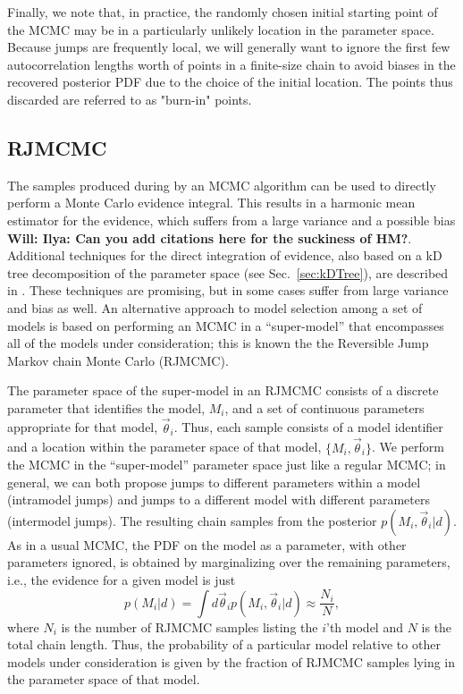 \documentclass[prd,preprint]{revtex4}
\newcommand{\vtheta}{\vec{\theta}}
\newcommand{\be}{\begin{equation}}
\newcommand{\ee}{\end{equation}}
\newcommand{\will}[1]{{\color{blue} \bf Will: #1}}
\begin{document}
Finally, we note that, in practice, the randomly chosen initial starting point of the MCMC may be in a particularly unlikely location in the parameter space.  Because jumps are frequently local, we will generally want to ignore the first few autocorrelation lengths worth of points in a finite-size chain to avoid biases in the recovered posterior PDF due to the choice of the initial location.  The points thus discarded are referred to as "burn-in" points.

\subsection{RJMCMC}

The samples produced during by an MCMC algorithm can be used to
directly perform a Monte Carlo evidence integral.  This results in a
harmonic mean estimator for the evidence, which suffers from a large
variance and a possible bias\will{Ilya: Can you add citations here for
  the suckiness of HM?}.  Additional techniques for the direct
integration of evidence, also based on a kD tree decomposition of the
parameter space (see Sec.~\ref{sec:kDTree}), are described in
\cite{Weinberg2009}.  These techniques are promising, but in some
cases suffer \cite{Farr2010} from large variance and bias as well.  An
alternative approach to model selection among a set of models is based
on performing an MCMC in a ``super-model'' that encompasses all of the
models under consideration; this is known the the Reversible Jump
Markov chain Monte Carlo (RJMCMC).

The parameter space of the super-model in an RJMCMC consists of a
discrete parameter that identifies the model, $M_i$, and a set of
continuous parameters appropriate for that model, $\vtheta_i$.  Thus,
each sample consists of a model identifier and a location within the
parameter space of that model, $\{M_i, \vtheta_i\}$.  We perform the
MCMC in the ``super-model'' parameter space just like a regular MCMC;
in general, we can both propose jumps to different parameters within a
model (intramodel jumps) and jumps to a different model with different
parameters (intermodel jumps).  The resulting chain samples from the
posterior $p(M_i,\vtheta_i|d)$.  As in a usual MCMC, the PDF on the
model as a parameter, with other parameters ignored, is obtained by
marginalizing over the remaining parameters, i.e., the evidence for a
given model is just
%
\be
p(M_i|d) = \int d\vtheta_i p(M_i, \vtheta_i|d) \approx \frac{N_i}{N},
\ee
%
where $N_i$ is the number of RJMCMC samples listing the $i$'th model
and $N$ is the total chain length.  Thus, the probability of a
particular model relative to other models under consideration is given
by the fraction of RJMCMC samples lying in the parameter space of that
model.
 
\end{document}
